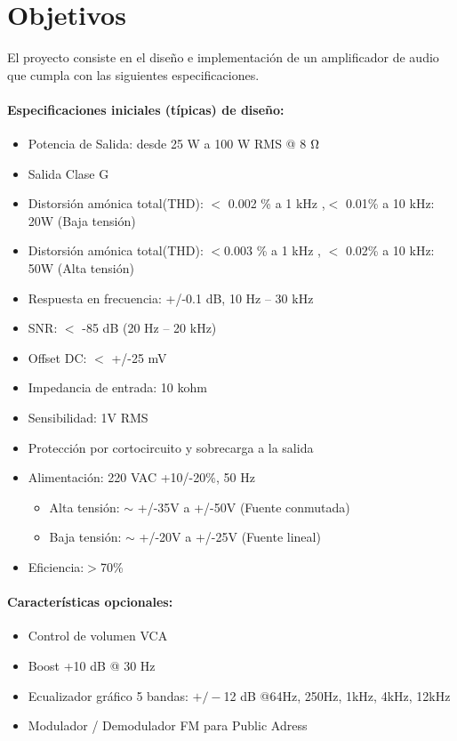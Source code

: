 \section{Objetivos}
\bigskip
El proyecto consiste en el diseño e implementación de un amplificador de audio que cumpla con las siguientes especificaciones.

\medskip 
\paragraph{Especificaciones iniciales (típicas) de diseño:}

\begin{itemize}
\item Potencia de Salida: desde 25 W a 100 W RMS @ 8 $\ohm$

\item Salida Clase G

\item  Distorsión amónica total(THD): $<$ 0.002 \% a 1 kHz ,$<$ 0.01\% a 10 kHz: 20W (Baja tensión)
\item  Distorsión amónica total(THD): $<$0.003 \% a 1 kHz , $<$ 0.02\% a 10 kHz: 50W (Alta tensión)
\item Respuesta en frecuencia: +/-0.1 dB, 10 Hz – 30 kHz
\item SNR: $<$ -85 dB (20 Hz – 20 kHz)
\item Offset DC: $<$ +/-25 mV
\item Impedancia de entrada: 10 kohm
\item Sensibilidad: 1V RMS
\item Protección por cortocircuito y sobrecarga a la salida
\item Alimentación: 220 VAC +10/-20\%, 50 Hz

\begin{itemize}
    \item Alta tensión: $\sim$ +/-35V a +/-50V (Fuente conmutada)
    \item Baja tensión: $\sim$ +/-20V a +/-25V (Fuente lineal)
\end{itemize}
    
\item  Eficiencia:$>$70\%

\end{itemize}
\medskip 
\paragraph*{Características opcionales:}

\begin{itemize}
\item  Control de volumen VCA
\item  Boost +10 dB @ 30 Hz
\item  Ecualizador gráfico 5 bandas: $+/-$12 dB @64Hz, 250Hz, 1kHz, 4kHz, 12kHz
\item  Modulador / Demodulador FM para Public Adress

\end{itemize}